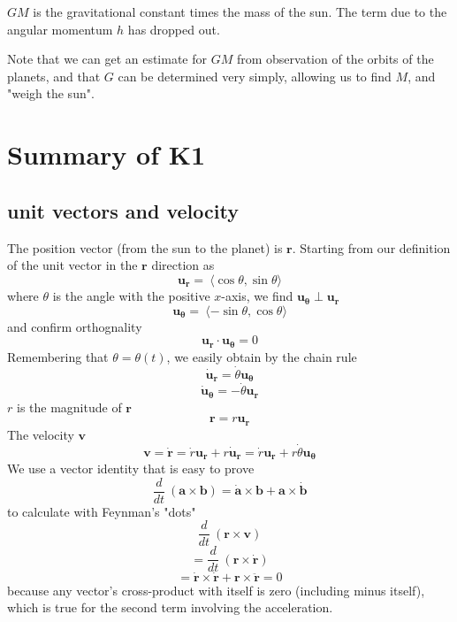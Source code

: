 \documentclass[11pt, oneside]{article}
\begin{document}
$GM$ is the gravitational constant times the mass of the sun.  The term due to the angular momentum $h$ has dropped out.

Note that we can get an estimate for $GM$ from observation of the orbits of the planets, and that $G$ can be determined very simply, allowing us to find $M$, and "weigh the sun".

\section*{Summary of K1}

\subsection*{unit vectors and velocity}
The position vector (from the sun to the planet) is $\mathbf{r}$.  Starting from our definition of the unit vector in the $\mathbf{r}$ direction as
\[ \mathbf{u_r} = \ \langle \cos \theta, \sin \theta \rangle \]
where $\theta$ is the angle with the positive $x$-axis, we find $\mathbf{u_{\theta}} \perp \mathbf{u_r}$
\[ \mathbf{u_{\theta}} = \ \langle -\sin \theta, \cos \theta \rangle \]
and confirm orthognality
\[ \mathbf{u_r} \cdot \mathbf{u_{\theta}} = 0 \]
Remembering that $\theta = \theta(t)$, we easily obtain by the chain rule
\[ \dot{\mathbf{u}}_\mathbf{r} = \dot{\theta} \mathbf{u_{\theta}} \]
\[  \dot{\mathbf{u}}_\mathbf{\theta} = -\dot{\theta} \mathbf{u_{r}} \]
$r$ is the magnitude of $\mathbf{r}$
\[ \mathbf{r} = r \mathbf{u_r} \]
The velocity $\mathbf{v}$
\[ \mathbf{v} = \dot{\mathbf{r}} = \dot{r} \mathbf{u_r} + r \dot{\mathbf{u}}_\mathbf{r}  =  \dot{r} \mathbf{u_r} +  r \dot{\theta}  \mathbf{u_{\theta}}\]
We use a vector identity that is easy to prove
\[ \frac{d}{dt} \ (\mathbf{a} \times \mathbf{b}) = \dot{\mathbf{a}} \times \mathbf{b} + \mathbf{a} \times \dot{\mathbf{b}} \]
to calculate with Feynman's "dots"
\[ \frac{d}{dt} \ (\mathbf{r} \times \mathbf{v}) \]
\[ =  \frac{d}{dt} \ (\mathbf{r} \times \dot{\mathbf{r}}) \]
\[  =  \dot{\mathbf{r}} \times \dot{\mathbf{r}} +  \mathbf{r} \times \ddot{\mathbf{r}} = 0\]
because any vector's cross-product with itself is zero (including minus itself), which is true for the second term involving the acceleration.
\end{document}
